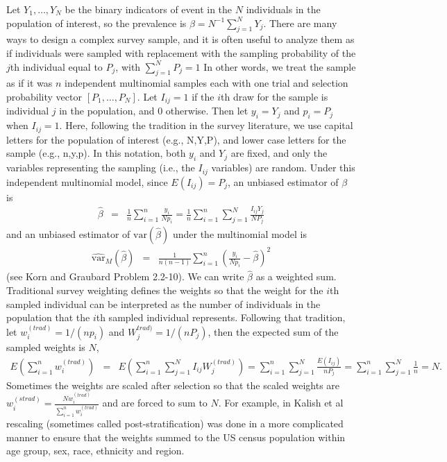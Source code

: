 \documentclass[AMA,STIX1COL]{WileyNJD-v2}
\begin{document}
Let $Y_1,\ldots, Y_N$ be the binary indicators of event in the $N$ individuals  in the population of interest,
so the prevalence is $\beta = N^{-1} \sum_{j=1}^{N} Y_j$. There are many ways to design a complex survey sample, and it is often useful to analyze them as if
individuals were sampled with replacement with the sampling probability of the $j$th  individual equal to $P_j$, with $\sum_{j=1}^{N} P_j = 1$
In other words, we treat the sample as if it was $n$ independent multinomial samples each with one trial and selection probability vector  $[P_1,\ldots, P_N]$.
Let $I_{ij}=1$ if the $i$th draw for the sample is individual $j$ in the population, and $0$ otherwise. Then let $y_i = Y_j$ and $p_i=P_j$ when $I_{ij}=1$.
Here, following the tradition in the survey literature, we use capital letters for the population of interest (e.g., N,Y,P), and lower case letters for the sample (e.g., n,y,p).
In this notation, both $y_i$ and $Y_j$ are fixed, and only the variables representing the sampling (i.e., the $I_{ij}$ variables) are random.
Under this independent multinomial model, since $E(I_{ij})=P_j$, an unbiased estimator of $\beta$ is
\begin{eqnarray}
\hat{\beta} & = & \frac{1}{n} \sum_{i=1}^{n} \frac{ y_i}{N p_i} = \frac{1}{n} \sum_{i=1}^{n} \sum_{j=1}^{N}  \frac{ I_{ij}  Y_j}{N P_j}
\label{eq:betahatMultinomial}
\end{eqnarray}
and an unbiased estimator of $\textrm{var}(\hat{\beta})$ under the multinomial model is
\begin{eqnarray}
\widehat{\textrm{var}}_{M}(\hat{\beta}) & = & \frac{1}{n (n-1)} \sum_{i=1}^{n} \left( \frac{y_i}{Np_i} - \hat{\beta}  \right)^2
\label{eq:varMbetahat}
\end{eqnarray}
(see Korn and Graubard \cite{Korn:1999} Problem 2.2-10). We can write $\hat{\beta}$ as a weighted sum. Traditional survey weighting defines the weights so that
the weight for the $i$th sampled individual can be interpreted as the number of individuals in the population that the $i$th sampled individual represents.
Following that tradition, let   $w_i^{(trad)}= 1/(np_i)$ and $W_j^{trad)}=1/(nP_j)$, then the expected sum of the sampled weights is $N$,
\begin{eqnarray*}
E \left( \sum_{i=1}^{n} w_i^{(trad)} \right)  & = & E \left(  \sum_{i=1}^{n} \sum_{j=1}^{N} I_{ij} W_j^{(trad)} \right) =    \sum_{i=1}^{n} \sum_{j=1}^{N} \frac{ E(I_{ij})}{ n P_j} =   \sum_{i=1}^{n} \sum_{j=1}^{N} \frac{1}{n} = N.
\end{eqnarray*}
Sometimes the weights are scaled after selection so that the scaled weights are $w_i^{(strad)} = \frac{ N w_i^{(trad)} }{\sum_{i=1}^{n} w_i^{(trad)}}$ and are forced to sum to $N$.
For example, in Kalish et al \cite{Kali:2021} rescaling (sometimes called post-stratification) was done in a more complicated manner to ensure that the weights summed to the US census population within age group, sex, race, ethnicity and region. 
\end{document}
